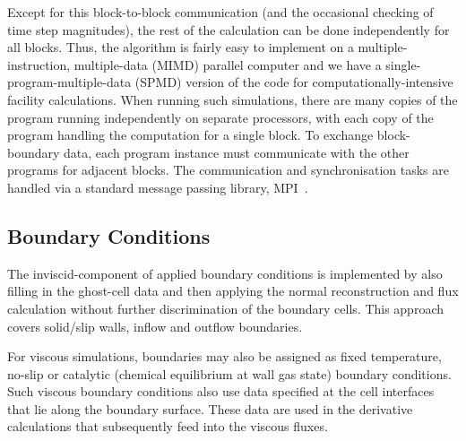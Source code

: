 \medskip
Except for this block-to-block communication (and the occasional checking of time step magnitudes),
the rest of the calculation can be done independently for all blocks.
Thus, the algorithm is fairly easy to implement on a multiple-instruction, multiple-data (MIMD) parallel computer and
we have a single-program-multiple-data (SPMD) version of the code 
for computationally-intensive facility calculations.
When running such simulations, there are many copies of the program running independently 
on separate processors, with each copy of the program handling the computation for a single block.
To exchange block-boundary data, each program instance must communicate with the other programs for adjacent blocks.
The communication and synchronisation tasks 
are handled via a standard message passing library, MPI~\cite{gropp_etal_1994a}. 

\subsection{Boundary Conditions}
%
The inviscid-component of applied boundary conditions is implemented by also filling in 
the ghost-cell data and then applying the normal reconstruction and flux calculation without
further discrimination of the boundary cells.
This approach covers solid/slip walls, inflow and outflow boundaries.

\medskip
For viscous simulations, boundaries may also be assigned as fixed temperature, 
no-slip or catalytic (chemical equilibrium at wall gas state) boundary conditions.
Such viscous boundary conditions also use data specified at the cell interfaces
that lie along the boundary surface.
These data are used in the derivative calculations that subsequently feed into 
the viscous fluxes.

